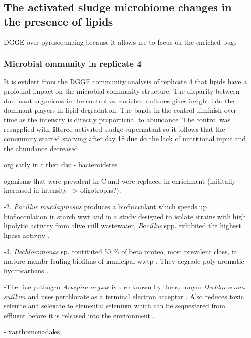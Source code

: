 \documentclass[11pt]{article}
\begin{document}
\subsection{The activated sludge microbiome changes in the presence of lipids}
DGGE over pyrosequncing because it allows me to focus on the enriched bugs
 \subsubsection{Microbial ommunity in replicate 4}
It is evident from the DGGE community analysis of replicate 4 that lipids have a profound impact on the microbial community structure. The disparity between dominant organisms in the control vs. enriched cultures gives insight into the dominant players in lipid degradation. The bands in the control diminish over time as the intensity is directly proportional to abundance. The control was resupplied with filtered activated sludge supernatant so it follows that the community started starving after day 18 due do the lack of nutritional input and the abundance decreased.

org early in c then dis:
- bacteroidetes

oganisms that were prevalent in C and were replaced in enrichment (inititally increased in intensity --> oligotrophs?):

-2. \emph{Bacillus mucilaginosus} produces a bioflocculant which speeds up bioflocculation in starch wwt \cite{deng2003characteristics} and in a study designed to isolate strains with high lipolytic activity from olive mill wastewater, \emph{Bacillus} spp. exhibited the highest lipase activity \cite{ertuugrul2007isolation}.

-3. \emph{Dechloromonas} sp. contituted 50 \% of beta proteo, most prevalent class,  in mature membr fouling biofilms of municipal wwtp \cite{miura2007membrane}. They degrade poly aromatic hydrocarbons \cite{oshiki2008pha}.

-The rice pathogen \emph{Azospira oryzae} is also known by the synonym \emph{Dechlorosoma suillum} and uses perchlorate as a terminal electron acceptor  \cite{reinhold2000reassessment,tan2003dechlorosoma}. Also reduces toxic selenite and selenate to elemental selenium which can be sequestered from effluent before it is released into the environment \cite{hunter2007azospira,wilhelmus2013microbiological}.

- xanthomonadales
\end{document}
